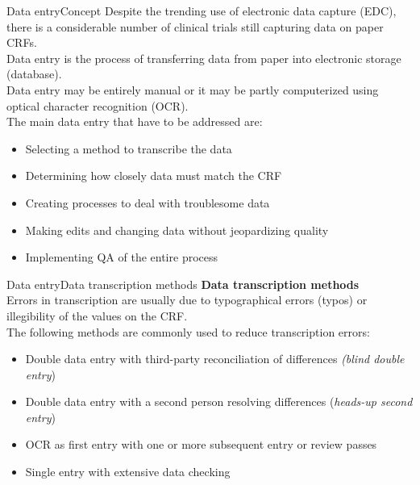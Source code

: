 \documentclass[xcolor=dvipsnames,11pt]{beamer}
\begin{document}
\begin{frame}[fragile]{Data entry}{Concept}
	Despite the trending use of electronic data capture (EDC), there is a considerable number of clinical trials still capturing data on paper CRFs.\\
	\bigskip
	\textcolor{PineGreen}{Data entry} is the process of transferring data from paper into electronic storage (database).\\
	\bigskip
	Data entry may be entirely manual or it may be partly computerized using optical character recognition (OCR).\\
	\bigskip
	The main data entry that have to be addressed are:
	\begin{itemize}
		\item Selecting a method to transcribe the data
		\item Determining how closely data must match the CRF
		\item Creating processes to deal with troublesome data
		\item Making edits and changing data without jeopardizing quality
		\item Implementing QA of the entire process
	\end{itemize}
\end{frame}

\begin{frame}[fragile]{Data entry}{Data transcription methods}
	\textbf{Data transcription methods}\\
	\bigskip
	Errors in transcription are usually due to typographical errors (typos) or illegibility of the values on the CRF.\\
	\bigskip
	The following methods are commonly used to reduce transcription errors:
	\begin{itemize}
		\item Double data entry with third-party reconciliation of differences \textit{(blind double entry})
		\item Double data entry with a second person resolving differences (\textit{heads-up second entry})
		\item OCR as first entry with one or more subsequent entry or review passes
		\item Single entry with extensive data checking
	\end{itemize}
\end{frame}
\end{document}
